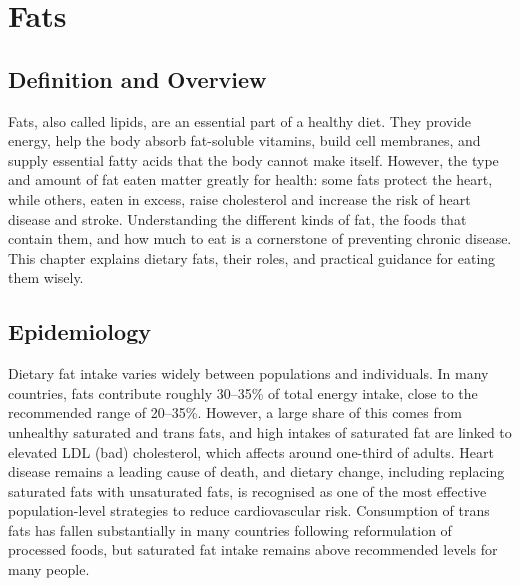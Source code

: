 \chapter{Fats}

\section*{Definition and Overview}
Fats, also called lipids, are an essential part of a healthy diet. They provide energy, help the body absorb fat-soluble vitamins, build cell membranes, and supply essential fatty acids that the body cannot make itself. However, the type and amount of fat eaten matter greatly for health: some fats protect the heart, while others, eaten in excess, raise cholesterol and increase the risk of heart disease and stroke. Understanding the different kinds of fat, the foods that contain them, and how much to eat is a cornerstone of preventing chronic disease. This chapter explains dietary fats, their roles, and practical guidance for eating them wisely.

\section*{Epidemiology}
Dietary fat intake varies widely between populations and individuals. In many countries, fats contribute roughly 30--35\% of total energy intake, close to the recommended range of 20--35\%. However, a large share of this comes from unhealthy saturated and trans fats, and high intakes of saturated fat are linked to elevated LDL (bad) cholesterol, which affects around one-third of adults. Heart disease remains a leading cause of death, and dietary change, including replacing saturated fats with unsaturated fats, is recognised as one of the most effective population-level strategies to reduce cardiovascular risk. Consumption of trans fats has fallen substantially in many countries following reformulation of processed foods, but saturated fat intake remains above recommended levels for many people.

